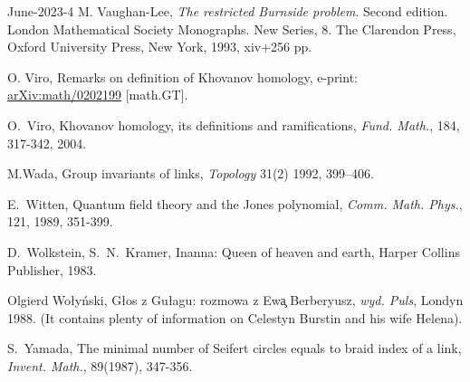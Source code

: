 \documentclass[12pt]{amsart}
\begin{document}
\begin{thebibliography}{June-2023-4}
M. Vaughan-Lee, \textit{The restricted Burnside
problem}. Second edition. London Mathematical Society Monographs. New
Series, 8. The Clarendon Press, Oxford University Press, New York, 1993, xiv+256 pp.

 O. Viro, Remarks on definition of Khovanov homology, e-print: \href{https://arxiv.org/abs/math/0202199}{arXiv:math/0202199} [math.GT].

O.~Viro, Khovanov homology, its definitions and ramifications, {\it Fund. Math.}, 184, 317-342, 2004.

M.Wada, Group invariants of links, {\it Topology} 31(2) 1992, 399--406.


E.~Witten, Quantum field theory and the Jones polynomial, {\it Comm. Math.
Phys.}, 121, 1989, 351-399.

D.~Wolkstein, S.~N.~Kramer, Inanna: Queen of heaven and earth,
Harper Collins Publisher, 1983.

Olgierd Wo{\l}y\'nski, G{\l}os z Gu{\l}agu: rozmowa z Ew{\c a} Berberyusz, {\it wyd. Puls}, Londyn 1988. (It contains plenty of information on Celestyn Burstin and his wife Helena).

S.~Yamada, The minimal number of Seifert circles equals to
braid index of a link, {\it Invent. Math.}, 89(1987), 347-356.
\end{thebibliography}
\end{document}
